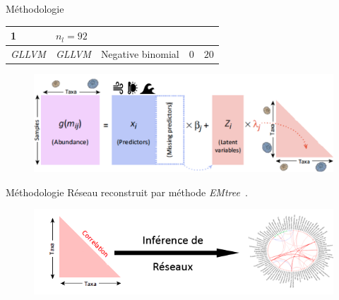 \documentclass[%
]{beamer}
\begin{document}
\begin{frame}{Méthodologie}
\begin{scriptsize}
\begin{longtable}[]{lllll}
\begin{minipage}[t]{0.24\columnwidth}
		1\strut
		\end{minipage} & \begin{minipage}[t]{0.22\columnwidth}\raggedright
		\(n_l = 92\)\strut
		\end{minipage}\tabularnewline\midrule%
		\begin{minipage}[t]{0.11\columnwidth}\raggedright
		\emph{GLLVM}\strut
		\end{minipage} & \begin{minipage}[t]{0.09\columnwidth}\raggedright
		\emph{GLLVM}\strut
		\end{minipage} & \begin{minipage}[t]{0.19\columnwidth}\raggedright
		Negative binomial\strut
		\end{minipage} & \begin{minipage}[t]{0.24\columnwidth}\raggedright
		0\strut
		\end{minipage} & \begin{minipage}[t]{0.22\columnwidth}\raggedright
		\(20\)\strut
		\end{minipage}\tabularnewline
		\bottomrule
		\end{longtable}
	\end{scriptsize}\vspace{\baselineskip}
	\begin{figure}[t]
		\begin{center}
			\includegraphics[scale = 0.14]{figs/lvm3.png}
		\end{center}
	\end{figure}
	\end{frame}
	
	\begin{frame}{Méthodologie}
		Réseau reconstruit par méthode \emph{EMtree}~\citep{Momal_2020}.\vspace{0.5\baselineskip}
		\begin{figure}[t]
		\begin{center}
			\includegraphics[scale =0.65]{figs/network_inf.png}
		\end{center}
		\end{figure}
	\end{frame}
	
\end{document}
